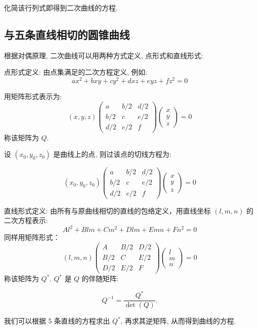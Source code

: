 化简该行列式即得到二次曲线的方程.

\subsection{与五条直线相切的圆锥曲线}

根据对偶原理, 二次曲线可以用两种方式定义, 点形式和直线形式:

点形式定义: 由点集满足的二次方程定义, 例如:
  \[
  ax^2 + bxy + cy^2 + dxz + eyz + fz^2 = 0
  \]
  
用矩阵形式表示为:
  \[
  (x, y, z) \begin{pmatrix} a & b/2 & d/2 \\ b/2 & c & e/2 \\ d/2 & e/2 & f \end{pmatrix} \begin{pmatrix} x \\ y \\ z \end{pmatrix} = 0
  \]
称该矩阵为 \( Q \).

设 $(x_0,y_0,z_0)$ 是曲线上的点,  则过该点的切线方程为:

\[
  (x_0,y_0,z_0) \begin{pmatrix} a & b/2 & d/2 \\ b/2 & c & e/2 \\ d/2 & e/2 & f \end{pmatrix} \begin{pmatrix} x \\ y \\ z \end{pmatrix} = 0
\]


直线形式定义: 由所有与原曲线相切的直线的包络定义，用直线坐标 \( (l, m, n) \) 的二次方程表示:
  \[
  Al^2 + Blm + Cm^2 + Dlm + Emn + Fn^2 = 0
  \]
同样用矩阵形式：
  \[
  (l, m, n) \begin{pmatrix} A & B/2 & D/2 \\ B/2 & C & E/2 \\ D/2 & E/2 & F \end{pmatrix} \begin{pmatrix} l \\ m \\ n \end{pmatrix} = 0
  \]
称该矩阵为 $Q^*$. $Q^*$ 是 $Q$ 的伴随矩阵:

\[
  Q^{-1} = \dfrac{Q^*}{\det(Q)}.
\]

我们可以根据 5 条直线的方程求出 $Q^*$, 再求其逆矩阵, 从而得到曲线的方程.

